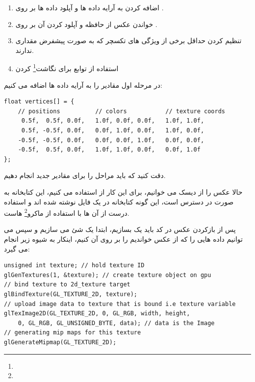 \documentclass[a4paper, 12pt]{report}
\newcommand{\lrbold}[1]{\lr{\textbf{#1}}}
\newcommand{\lrit}[1]{\lr{\textit{#1}}}
\begin{document}
\begin{persian}
    \begin{enumerate}
      \item اضافه کردن  به آرایه داده ها و آپلود داده ها بر روی .
      \item خواندن عکس از حافظه و آپلود کردن آن بر روی .
      \item تنظیم کردن حداقل برخی از ویژگی های تکسچر که به صورت پیشفرض مقداری ندارند.
      \item استفاده از توابع  برای نگاشت\footnote{} کردن 
    \end{enumerate}
\end{persian}

    در مرحله اول مقادیر  را به آرایه داده ها اضافه می کنیم:
    \begin{LTR}
    \small
        \begin{lstlisting}[style=C++Style,caption=\lrit{position and color data in one array}]
float vertices[] = {
    // positions          // colors           // texture coords
     0.5f,  0.5f, 0.0f,   1.0f, 0.0f, 0.0f,   1.0f, 1.0f,
     0.5f, -0.5f, 0.0f,   0.0f, 1.0f, 0.0f,   1.0f, 0.0f,
    -0.5f, -0.5f, 0.0f,   0.0f, 0.0f, 1.0f,   0.0f, 0.0f,
    -0.5f,  0.5f, 0.0f,   1.0f, 1.0f, 0.0f,   0.0f, 1.0f
};
        \end{lstlisting}
    \end{LTR}
    \normalsize
    \vspace*{0.3cm}

    دقت کنید که باید مراحل  را برای مقادیر جدید انجام دهیم.

    حالا عکس را از دیسک می خوانیم، برای این کار از \href{https://github.com/nothings/stb}{\lrbold{stbi\_image}} استفاده می کنیم، این کتابخانه به صورت  در دسترس است، این گونه کتابخانه در یک فایل نوشته شده اند و استفاده درست از آن ها با استفاده از ماکرو\footnote{} هاست.

    پس از بازکردن عکس در کد باید یک  بسازیم، ابتدا یک شئ می سازیم و سپس می توانیم داده هایی را که از عکس  خواندیم را بر روی آن  کنیم، اینکار به شیوه زیر انجام می گیرد:

    \begin{LTR}
    \small
        \begin{lstlisting}[style=C++Style,caption=\lrit{load and upload data to gpu}]
unsigned int texture; // hold texture ID
glGenTextures(1, &texture); // create texture object on gpu
// bind texture to 2d_texture target
glBindTexture(GL_TEXTURE_2D, texture);
// upload image data to texture that is bound i.e texture variable
glTexImage2D(GL_TEXTURE_2D, 0, GL_RGB, width, height,
    0, GL_RGB, GL_UNSIGNED_BYTE, data); // data is the Image
// generating mip maps for this texture
glGenerateMipmap(GL_TEXTURE_2D);
        \end{lstlisting}
    \end{LTR}
    \normalsize
    \vspace*{0.3cm}
\end{document}
